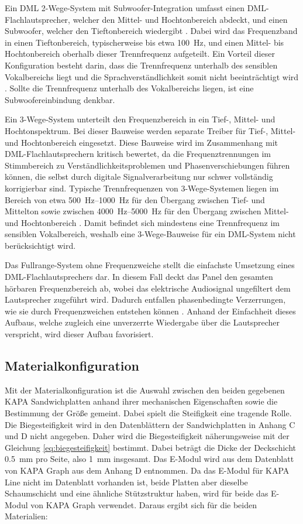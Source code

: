 Ein DML 2-Wege-System mit Subwoofer-Integration umfasst einen DML-Flachlautsprecher, welcher den Mittel- und Hochtonbereich abdeckt, und einen Subwoofer, welcher den Tieftonbereich wiedergibt \cite{Czesak2025}. Dabei wird das Frequenzband in einen Tieftonbereich, typischerweise bis etwa \SI{100}{\hertz}, und einen Mittel- bis Hochtonbereich oberhalb dieser Trennfrequenz aufgeteilt. Ein Vorteil dieser Konfiguration besteht darin, dass die Trennfrequenz unterhalb des sensiblen Vokalbereichs liegt und die Sprachverständlichkeit somit nicht beeinträchtigt wird \cite{Weinzierl2025}. Sollte die Trennfrequenz unterhalb des Vokalbereichs liegen, ist eine Subwoofereinbindung denkbar.

Ein 3-Wege-System unterteilt den Frequenzbereich in ein Tief-, Mittel- und Hochtonspektrum. Bei dieser Bauweise werden separate Treiber für Tief-, Mittel- und Hochtonbereich eingesetzt. Diese Bauweise wird im Zusammenhang mit DML-Flachlautsprechern kritisch bewertet, da die Frequenztrennungen im Stimmbereich zu Verständlichkeitsproblemen und Phasenverschiebungen führen können, die selbst durch digitale Signalverarbeitung nur schwer vollständig korrigierbar sind. Typische Trennfrequenzen von 3-Wege-Systemen liegen im Bereich von etwa \SIrange{500}{1000}{\hertz} für den Übergang zwischen Tief- und Mittelton sowie zwischen \SIrange{4000}{5000}{\hertz} für den Übergang zwischen Mittel- und Hochtonbereich \cite{Weinzierl2025}. Damit befindet sich mindestens eine Trennfrequenz im sensiblen Vokalbereich, weshalb eine 3-Wege-Bauweise für ein DML-System nicht berücksichtigt wird.

Das Fullrange-System ohne Frequenzweiche stellt die einfachste Umsetzung eines DML-Flachlautsprechers dar. In diesem Fall deckt das Panel den gesamten hörbaren Frequenzbereich ab, wobei das elektrische Audiosignal ungefiltert dem Lautsprecher zugeführt wird. Dadurch entfallen phasenbedingte Verzerrungen, wie sie durch Frequenzweichen entstehen können \cite{Moeser2005}. Anhand der Einfachheit dieses Aufbaus, welche zugleich eine unverzerrte Wiedergabe über die Lautsprecher verspricht, wird dieser Aufbau favorisiert. 


\subsection{Materialkonfiguration}

Mit der Materialkonfiguration ist die Auswahl zwischen den beiden gegebenen KAPA Sandwichplatten anhand ihrer mechanischen Eigenschaften sowie die Bestimmung der Größe gemeint. Dabei spielt die Steifigkeit eine tragende Rolle. Die Biegesteifigkeit wird in den Datenblättern der Sandwichplatten in Anhang C und D nicht angegeben. Daher wird die Biegesteifigkeit näherungsweise mit der Gleichung \ref{eq:biegesteifigkeit} bestimmt. 
Dabei beträgt die Dicke der Deckschicht \SI{0,5}{\milli\meter} pro Seite, also \SI{1}{\milli\meter} insgesamt. Das E-Modul wird aus dem Datenblatt von KAPA Graph aus dem Anhang D entnommen. 
Da das E-Modul für KAPA Line nicht im Datenblatt vorhanden ist, beide Platten aber dieselbe Schaumschicht und eine ähnliche Stützstruktur haben, wird für beide das E-Modul von KAPA Graph verwendet. Daraus ergibt sich für die beiden Materialien: 

